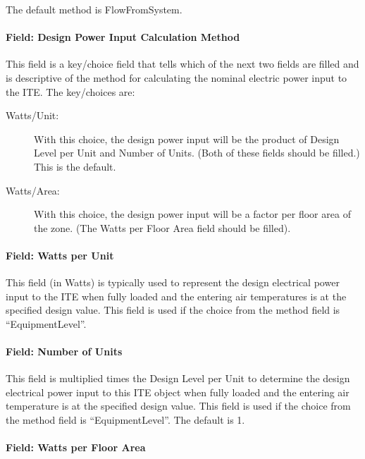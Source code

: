The default method is FlowFromSystem.

\paragraph{Field: Design Power Input Calculation Method}\label{field-design-power-input-calculation-method}

This field is a key/choice field that tells which of the next two fields are filled and is descriptive of the method for calculating the nominal electric power input to the ITE. The key/choices are:

\begin{description}
	\item[Watts/Unit:] With this choice, the design power input will be the product of Design Level per Unit and Number of Units. (Both of these fields should be filled.) This is the default.

	\item[Watts/Area:] With this choice, the design power input will be a factor per floor area of the zone. (The Watts per Floor Area field should be filled).
\end{description}

\paragraph{Field: Watts per Unit}\label{field-watts-per-unit}

This field (in Watts) is typically used to represent the design electrical power input to the ITE when fully loaded and the entering air temperatures is at the specified design value. This field is used if the choice from the method field is ``EquipmentLevel''.

\paragraph{Field: Number of Units}\label{field-number-of-units}

This field is multiplied times the Design Level per Unit to determine the design electrical power input to this ITE object when fully loaded and the entering air temperature is at the specified design value. This field is used if the choice from the method field is ``EquipmentLevel''. The default is 1.

\paragraph{Field: Watts per Floor Area}\label{field-watts-per-zone-floor-area-2}


